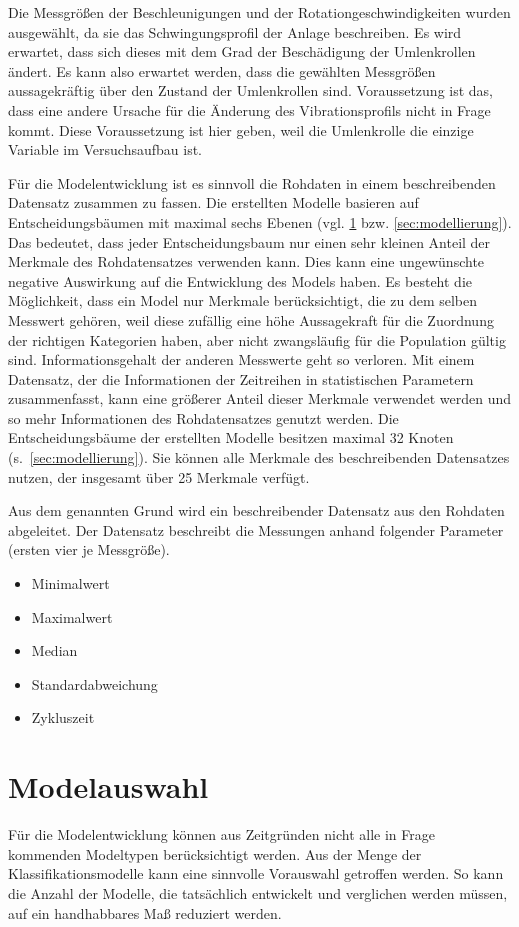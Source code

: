 Die Messgrößen der Beschleunigungen und der Rotationgeschwindigkeiten wurden ausgewählt, da sie das Schwingungsprofil der Anlage beschreiben. Es wird erwartet, dass sich dieses mit dem Grad der Beschädigung der Umlenkrollen ändert. Es kann also erwartet werden, dass die gewählten Messgrößen aussagekräftig über den Zustand der Umlenkrollen sind. Voraussetzung ist das, dass eine andere Ursache für die Änderung des Vibrationsprofils nicht in Frage kommt. Diese Voraussetzung ist hier geben, weil die Umlenkrolle die einzige Variable im Versuchsaufbau ist.

Für die Modelentwicklung ist es sinnvoll die Rohdaten in einem beschreibenden Datensatz zusammen zu fassen. Die erstellten Modelle basieren auf Entscheidungsbäumen mit maximal sechs Ebenen (vgl. \cref{sec:modelauswahl} bzw. \cref{sec:modellierung}). Das bedeutet, dass jeder Entscheidungsbaum nur einen sehr kleinen Anteil der Merkmale des Rohdatensatzes verwenden kann. Dies kann eine ungewünschte negative Auswirkung auf die Entwicklung des Models haben. Es besteht die Möglichkeit, dass ein Model nur Merkmale berücksichtigt, die zu dem selben Messwert gehören, weil diese zufällig eine höhe Aussagekraft für die Zuordnung der richtigen Kategorien haben, aber nicht zwangsläufig für die Population gültig sind. Informationsgehalt der anderen Messwerte geht so verloren. Mit einem Datensatz, der die Informationen der Zeitreihen in statistischen Parametern zusammenfasst, kann eine größerer Anteil dieser Merkmale verwendet werden und so mehr Informationen des Rohdatensatzes genutzt werden. Die Entscheidungsbäume der erstellten Modelle besitzen maximal \num{32} Knoten (s.~\cref{sec:modellierung}). Sie können alle Merkmale des beschreibenden Datensatzes nutzen, der insgesamt über \num{25} Merkmale verfügt.

Aus dem genannten Grund wird ein beschreibender Datensatz aus den Rohdaten abgeleitet. Der Datensatz beschreibt die Messungen anhand folgender Parameter (ersten vier je Messgröße).
\begin{itemize}
	\item Minimalwert
	\item Maximalwert
	\item Median
	\item Standardabweichung
	\item Zykluszeit
\end{itemize}
\section{Modelauswahl}
\label{sec:modelauswahl}
Für die Modelentwicklung können aus Zeitgründen nicht alle in Frage kommenden Modeltypen berücksichtigt werden. Aus der Menge der Klassifikationsmodelle kann eine sinnvolle Vorauswahl getroffen werden. So kann die Anzahl der Modelle, die tatsächlich entwickelt und verglichen werden müssen, auf ein handhabbares Maß reduziert werden.

